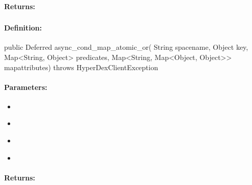 \paragraph{Returns:}


\pagebreak
\subsubsection{}
\label{api:java:async_cond_map_atomic_or}


\paragraph{Definition:}
\begin{javacode}
public Deferred async_cond_map_atomic_or(
        String spacename,
        Object key,
        Map<String, Object> predicates,
        Map<String, Map<Object, Object>> mapattributes) throws HyperDexClientException
\end{javacode}

\paragraph{Parameters:}
\begin{itemize}[noitemsep]
\item {}\\

\item {}\\

\item {}\\

\item {}\\

\end{itemize}

\paragraph{Returns:}


